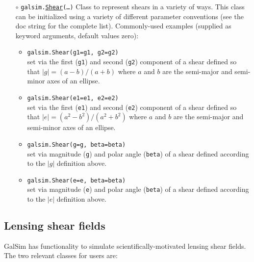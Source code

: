 \documentclass[preprint,10pt]{../../devel/modules/aastex}
\newcommand\Shear{\href{http://galsim-developers.github.io/GalSim/classgalsim_1_1shear_1_1_shear.html}{\texttt{Shear}}}
\begin{document}
\begin{itemize}

  \item[$\circ$]
  \texttt{galsim.}\Shear\texttt{(\dots)}
    \newline 
    Class to represent shears in a variety of ways.  This class can be initialized using a
    variety of different parameter conventions (see
    the doc string for the complete list).  Commonly-used examples (supplied as
    keyword arguments, default values zero):
    \begin{itemize}
      \item \texttt{galsim.Shear(g1=g1, g2=g2)} \\
        set via the first (\texttt{g1}) and second (\texttt{g2}) component
        of a shear defined so that $|g| = (a - b) / (a + b)$ where $a$ and
        $b$ are the semi-major and semi-minor axes of an ellipse.
      \item \texttt{galsim.Shear(e1=e1, e2=e2)} \\
        set via the first (\texttt{e1}) and second (\texttt{e2}) component
        of a shear defined so that $|e| = (a^2 - b^2) / (a^2 + b^2)$ where $a$ and
        $b$ are the semi-major and semi-minor axes of an ellipse.
      \item \texttt{galsim.Shear(g=g, beta=beta)} \\
        set via magnitude (\texttt{g}) and polar angle (\texttt{beta}) of a
        shear defined according to the $|g|$ definition above.
      \item \texttt{galsim.Shear(e=e, beta=beta)} \\
        set via magnitude (\texttt{e}) and polar angle (\texttt{beta}) of a
        shear defined according to the $|e|$ definition above.
   \end{itemize}

\end{itemize}

\subsection{Lensing shear fields}\label{sect:lensing}

GalSim has functionality to simulate scientifically-motivated lensing
shear fields.  The two relevant classes for users are:
\end{document}
